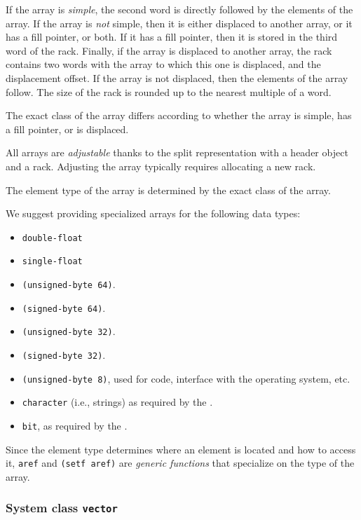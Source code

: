 If the array is \emph{simple}, the second word is directly followed
by the elements of the array.  If the array is \emph{not} simple, then
it is either displaced to another array, or it has a fill pointer, or
both.  If it has a fill pointer, then it is stored in the third word
of the rack.  Finally, if the array is displaced to another
array, the rack contains two words with the array to which
this one is displaced, and the displacement offset.  If the array is
not displaced, then the elements of the array follow.  The size of the
rack is rounded up to the nearest multiple of a word. 

The exact class of the array differs according to whether the array is
simple, has a fill pointer, or is displaced. 

All arrays are \emph{adjustable} thanks to the split representation
with a header object and a rack.  Adjusting the array
typically requires allocating a new rack. 

The element type of the array is determined by the exact class of the
array. 

We suggest providing specialized arrays for the following data types:

\begin{itemize}
\item \texttt{double-float}
\item \texttt{single-float}
\item \texttt{(unsigned-byte 64)}.
\item \texttt{(signed-byte 64)}.
\item \texttt{(unsigned-byte 32)}.
\item \texttt{(signed-byte 32)}.  
\item \texttt{(unsigned-byte 8)}, used for code, interface with the
  operating system, etc. 
\item \texttt{character} (i.e., strings) as required by the \hs{}.
\item \texttt{bit}, as required by the \hs{}.
\end{itemize}

Since the element type determines where an element is located and how
to access it, \texttt{aref} and \texttt{(setf aref)} are \emph{generic
  functions} that specialize on the type of the array. 

\subsubsection{System class \texttt{vector}}

